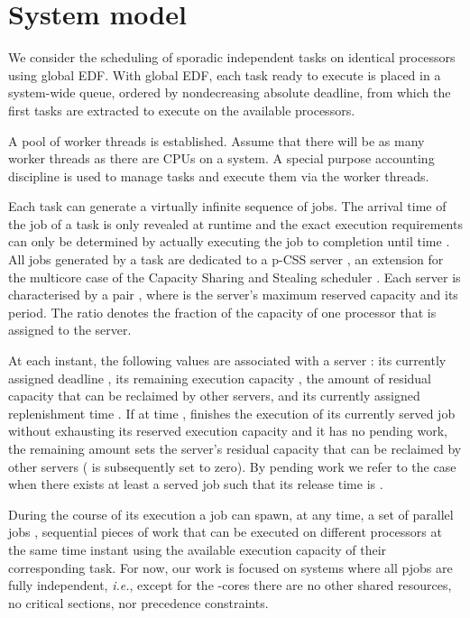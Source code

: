 \documentclass[10pt,twocolumn]{article}
\begin{document}
\section{System model}

We consider the scheduling of sporadic independent tasks on  identical processors  using global EDF. With global EDF, each task ready to execute is placed in a system-wide queue, ordered by nondecreasing absolute deadline, from which the first  tasks are extracted to execute on the available processors. 

A pool of worker threads is established. Assume that there will be as many worker threads as there are CPUs on a system. A special purpose accounting discipline is used to manage tasks and execute them via the worker threads.

Each task  can generate a virtually infinite sequence of jobs. The arrival time  of the  job of a task  is only revealed at runtime and the exact execution requirements  can only be determined by actually executing the job to completion until time . All jobs generated by a task  are dedicated to a p-CSS server , an extension for the multicore case of the Capacity Sharing and Stealing scheduler \cite{luisJSA10}. Each server  is characterised by a pair , where  is the server's maximum reserved capacity and  its period. The ratio  denotes the fraction of the capacity of one processor that is assigned to the server. 

At each instant, the following values are associated with a server : its currently assigned deadline , its remaining execution capacity , the amount of residual capacity  that can be reclaimed by other servers, and its currently assigned replenishment time . If at time ,  finishes the execution of its currently served job without exhausting its reserved execution capacity  and it has no pending work, the remaining amount  sets the server's residual capacity  that can be reclaimed by other servers ( is subsequently set to zero). By pending work we refer to the case when there exists at least a served job such that its release time is . 

During the course of its execution a job can spawn, at any time, a set of parallel jobs , sequential pieces of work that can be executed on different processors at the same time instant using the available execution capacity of their corresponding task. For now, our work is focused on systems where all pjobs are fully independent, \emph{i.e.}, except for the -cores there are no other shared resources, no critical sections, nor precedence constraints.
\end{document}
